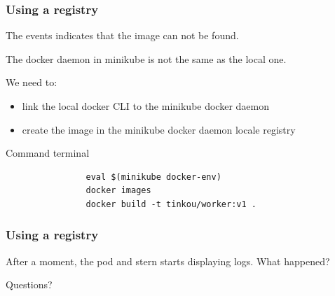 	\begin{frame}[fragile]
		\frametitle{Using a registry}
		
		The events indicates that the image can not be found.
		
		\medskip
		
		The docker daemon in minikube is not the same as the local one.
		
		\medskip 
		We need to:
		\begin{itemize}
			\item link the local docker CLI to the minikube docker daemon
			\item create the image in the minikube docker daemon locale registry
		\end{itemize}
		
		\begin{block}{Command terminal}
			\begin{verbatim}
				eval $(minikube docker-env)
				docker images
				docker build -t tinkou/worker:v1 .
			\end{verbatim}
		\end{block}

	\end{frame}
	
	\begin{frame}[fragile]
		\frametitle{Using a registry}
	
		After a moment, the pod and stern starts displaying logs. What happened?
		
		\bigskip
		
	
	\end{frame}


	\begin{frame}
		\begin{center}
			Questions?
		\end{center}
	\end{frame}